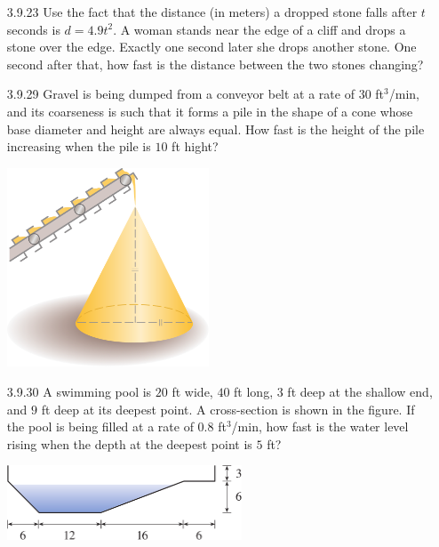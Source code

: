 \documentclass{article}
\begin{document}
\begin{enumerate}

\item[3.9.23]
    Use the fact that the distance (in meters) a dropped stone falls after $t$
    seconds is $d = 4.9t^{2}$. A woman stands near the edge of a cliff and drops
    a stone over the edge. Exactly one second later she drops another stone.
    One second after that, how fast is the distance between the two stones
    changing?

\vspace{6cm}

\item[3.9.29]
    Gravel is being dumped from a conveyor belt at a rate of $30$ ft$^3$/min,
    and its coarseness is such that it forms a pile in the shape of a cone
    whose base diameter and height are always equal. How fast is the height
    of the pile increasing when the pile is $10$ ft hight?

    \begin{center}
        \includegraphics[width=6cm]{./png/3.9.29.png}
    \end{center}

\newpage

\item[3.9.30]
    A swimming pool is $20$ ft wide, $40$ ft long, $3$ ft deep at the shallow end,
    and $9$ ft deep at its deepest point. A cross-section is shown in the figure.
    If the pool is being filled at a rate of $0.8$ ft$^3$/min, how fast is the water level
    rising when the depth at the deepest point is $5$ ft?

    \begin{center}
        \includegraphics[width=7cm]{./png/3.9.30.png}
    \end{center}


\end{enumerate}
\end{document}
